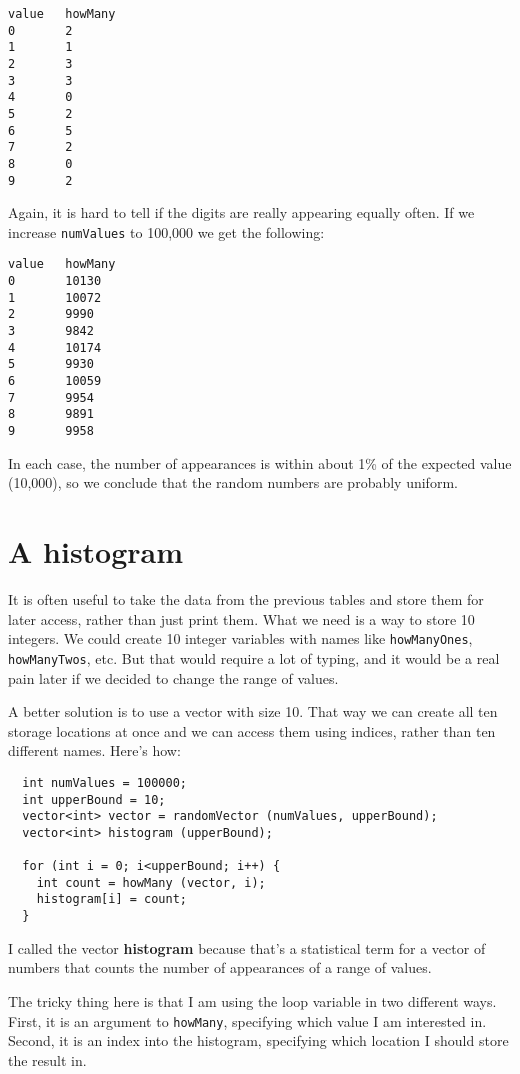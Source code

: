 \begin{verbatim}
value   howMany
0       2
1       1
2       3
3       3
4       0
5       2
6       5
7       2
8       0
9       2
\end{verbatim}
%
Again, it is hard to tell if the digits are really appearing
equally often.  If we increase {\tt numValues} to 100,000 we
get the following:

\begin{verbatim}
value   howMany
0       10130
1       10072
2       9990
3       9842
4       10174
5       9930
6       10059
7       9954
8       9891
9       9958
\end{verbatim}
%
In each case, the number of appearances is within about 1\% of
the expected value (10,000), so we conclude that the random
numbers are probably uniform.

\section {A histogram}

It is often useful to take the data from the previous tables
and store them for later access, rather than just print them.
What we need is a way to store 10 integers.  We could create
10 integer variables with names like {\tt howManyOnes},
{\tt howManyTwos}, etc.  But that would require a lot of
typing, and it would be a real pain later if we decided to
change the range of values.

A better solution is to use a vector with size 10.  That
way we can create all ten storage locations at once and we
can access them using indices, rather than ten different names.
Here's how:

\begin{verbatim}
  int numValues = 100000;
  int upperBound = 10;
  vector<int> vector = randomVector (numValues, upperBound);
  vector<int> histogram (upperBound);

  for (int i = 0; i<upperBound; i++) {
    int count = howMany (vector, i);
    histogram[i] = count;
  }
\end{verbatim}
%
I called the vector {\bf histogram} because that's
a statistical term for a vector of numbers that counts the
number of appearances of a range of values.


The tricky thing here is that I am using the loop variable
in two different ways.  First, it is an argument to {\tt howMany},
specifying which value I am interested in.  Second, it is
an index into the histogram, specifying which location I should
store the result in.

